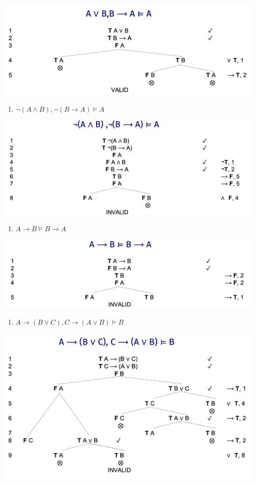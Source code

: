 \documentclass[
  11pt,
]{article}
\providecommand{\tightlist}{%
  \setlength{\itemsep}{0pt}\setlength{\parskip}{0pt}}
\begin{document}
\includegraphics{q05.png}

\begin{enumerate}
\def\labelenumi{\arabic{enumi}.}
\setcounter{enumi}{5}
\tightlist
\item
  \(\neg (A \wedge B), \neg (B \rightarrow A) \vDash A\)
\end{enumerate}

\includegraphics{q06.png}

\begin{enumerate}
\def\labelenumi{\arabic{enumi}.}
\setcounter{enumi}{6}
\tightlist
\item
  \(A \rightarrow B \vDash B \rightarrow A\)
\end{enumerate}

\includegraphics{q07.png}

\begin{enumerate}
\def\labelenumi{\arabic{enumi}.}
\setcounter{enumi}{7}
\tightlist
\item
  \(A \rightarrow (B \vee C), C \rightarrow (A \vee B) \vDash B\)
\end{enumerate}

\includegraphics{q08.png}
\end{document}
